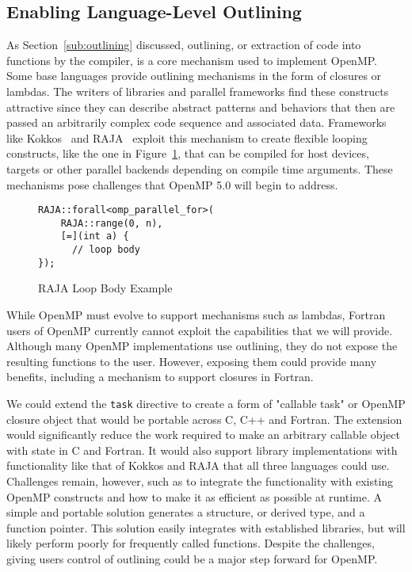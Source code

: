 \subsection{Enabling Language-Level Outlining}
\label{sub:enabling_language_level_outlining}

As Section~\ref{sub:outlining} discussed, outlining, or extraction of code 
into functions by the compiler, is a core mechanism used to implement OpenMP. 
Some base languages provide outlining mechanisms in the form of closures or 
lambdas. The writers of libraries and parallel frameworks find these 
constructs attractive since they can describe abstract patterns and behaviors 
that then are passed an arbitrarily complex code sequence and associated data.
Frameworks like Kokkos~\cite{kokkos} and RAJA~\cite{raja} exploit this 
mechanism to create flexible looping constructs, like the one in 
Figure~\ref{fig:raja}, that can be compiled for host devices, targets or 
other parallel backends depending on compile time arguments. These 
mechanisms pose challenges that OpenMP 5.0 will begin to address.

\begin{figure}
\begin{verbatim}
RAJA::forall<omp_parallel_for>(
    RAJA::range(0, n),
    [=](int a) {
      // loop body
});
\end{verbatim}
\caption{RAJA Loop Body Example\label{fig:raja}}
\end{figure}

While OpenMP must evolve to support mechanisms such as lambdas, Fortran
users of OpenMP currently cannot exploit the capabilities that we will 
provide. Although many OpenMP implementations use outlining, they do not 
expose the resulting functions to the user. However, exposing them could 
provide many benefits, including a mechanism to support closures in Fortran.
 
We could extend the \texttt{task} directive to create a form 
of "callable task" or OpenMP closure object that would be portable across 
C, C++ and Fortran. The extension would significantly reduce the work 
required to make an arbitrary callable object with state in C and Fortran.
It would also support library implementations with functionality like that 
of Kokkos and RAJA that all three languages could use. Challenges remain,
however, such as to integrate the functionality with existing OpenMP 
constructs and how to make it as efficient as possible at runtime. A simple 
and portable solution generates a structure, or derived type, and a function 
pointer. This solution easily integrates with established libraries, but will
likely perform poorly for frequently called functions. Despite the challenges,
giving users control of outlining could be a major step forward for OpenMP.


